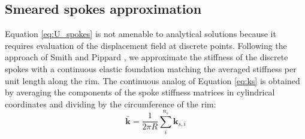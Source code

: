 \documentclass[\rootdir/thesis.tex]{subfiles}
\begin{document}






\subsection{Smeared spokes approximation}
Equation \ref{eq:U_spokes} is not amenable to analytical solutions because it requires evaluation of the displacement field at discrete points. Following the approach of Smith \cite{Smith1901} and Pippard \cite{Pippard1931}, we approximate the stiffness of the discrete spokes with a continuous elastic foundation matching the averaged stiffness per unit length along the rim. The continuous analog of Equation \eqref{eq:ks} is obtained by averaging the components of the spoke stiffness matrices in cylindrical coordinates and dividing by the circumference of the rim:
\begin{equation}
\label{eq:k_bar}
\mathbf{\bar{k}} = \frac{1}{2\pi R} \sum_i^{n_s} \mathbf{k}_{s,i}
\end{equation}
\end{document}
